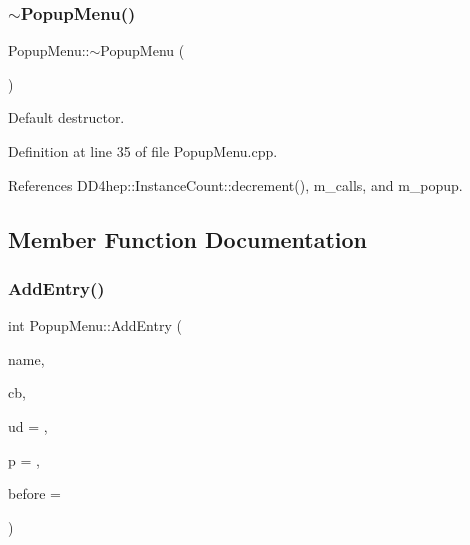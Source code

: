 \subsubsection{\texorpdfstring{$\sim$\+Popup\+Menu()}{~PopupMenu()}}
{\footnotesize\ttfamily Popup\+Menu\+::$\sim$\+Popup\+Menu (\begin{DoxyParamCaption}{ }\end{DoxyParamCaption})\hspace{0.3cm}{\ttfamily [virtual]}}



Default destructor. 



Definition at line 35 of file Popup\+Menu.\+cpp.



References D\+D4hep\+::\+Instance\+Count\+::decrement(), m\+\_\+calls, and m\+\_\+popup.



\subsection{Member Function Documentation}
\hypertarget{class_d_d4hep_1_1_popup_menu_a31d232887f2d18d1437836641cdf9c62}{}\label{class_d_d4hep_1_1_popup_menu_a31d232887f2d18d1437836641cdf9c62} 
\subsubsection{\texorpdfstring{Add\+Entry()}{AddEntry()}\hspace{0.1cm}{\footnotesize\ttfamily [1/2]}}
{\footnotesize\ttfamily int Popup\+Menu\+::\+Add\+Entry (\begin{DoxyParamCaption}\item[{const char $\ast$}]{name,  }\item[{\hyperlink{class_d_d4hep_1_1_callback}{Callback}}]{cb,  }\item[{void $\ast$}]{ud = {},  }\item[{const T\+G\+Picture $\ast$}]{p = {},  }\item[{T\+G\+Menu\+Entry $\ast$}]{before = {} }\end{DoxyParamCaption})\hspace{0.3cm}{\ttfamily [virtual]}}



